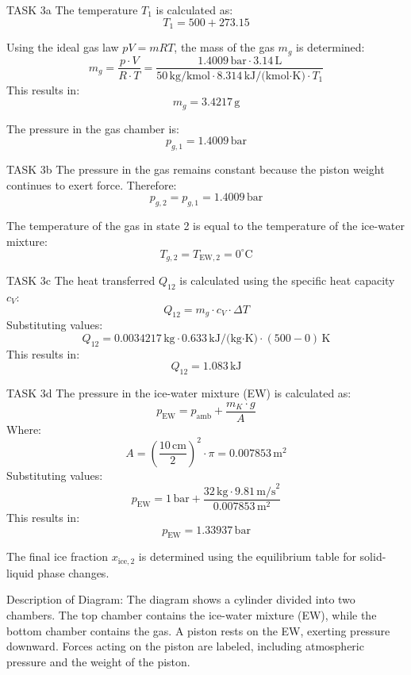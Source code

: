 TASK 3a  
The temperature \( T_1 \) is calculated as:  
\[
T_1 = 500 + 273.15
\]  

Using the ideal gas law \( pV = mRT \), the mass of the gas \( m_g \) is determined:  
\[
m_g = \frac{p \cdot V}{R \cdot T} = \frac{1.4009 \, \text{bar} \cdot 3.14 \, \text{L}}{50 \, \text{kg/kmol} \cdot 8.314 \, \text{kJ/(kmol·K)} \cdot T_1}
\]  
This results in:  
\[
m_g = 3.4217 \, \text{g}
\]  

The pressure in the gas chamber is:  
\[
p_{g,1} = 1.4009 \, \text{bar}
\]  

TASK 3b  
The pressure in the gas remains constant because the piston weight continues to exert force. Therefore:  
\[
p_{g,2} = p_{g,1} = 1.4009 \, \text{bar}
\]  

The temperature of the gas in state 2 is equal to the temperature of the ice-water mixture:  
\[
T_{g,2} = T_{\text{EW},2} = 0^\circ\text{C}
\]  

TASK 3c  
The heat transferred \( Q_{12} \) is calculated using the specific heat capacity \( c_V \):  
\[
Q_{12} = m_g \cdot c_V \cdot \Delta T
\]  
Substituting values:  
\[
Q_{12} = 0.0034217 \, \text{kg} \cdot 0.633 \, \text{kJ/(kg·K)} \cdot (500 - 0) \, \text{K}
\]  
This results in:  
\[
Q_{12} = 1.083 \, \text{kJ}
\]  

TASK 3d  
The pressure in the ice-water mixture (EW) is calculated as:  
\[
p_{\text{EW}} = p_{\text{amb}} + \frac{m_K \cdot g}{A}
\]  
Where:  
\[
A = \left( \frac{10 \, \text{cm}}{2} \right)^2 \cdot \pi = 0.007853 \, \text{m}^2
\]  
Substituting values:  
\[
p_{\text{EW}} = 1 \, \text{bar} + \frac{32 \, \text{kg} \cdot 9.81 \, \text{m/s}^2}{0.007853 \, \text{m}^2}
\]  
This results in:  
\[
p_{\text{EW}} = 1.33937 \, \text{bar}
\]  

The final ice fraction \( x_{\text{ice},2} \) is determined using the equilibrium table for solid-liquid phase changes.  

Description of Diagram:  
The diagram shows a cylinder divided into two chambers. The top chamber contains the ice-water mixture (EW), while the bottom chamber contains the gas. A piston rests on the EW, exerting pressure downward. Forces acting on the piston are labeled, including atmospheric pressure and the weight of the piston.